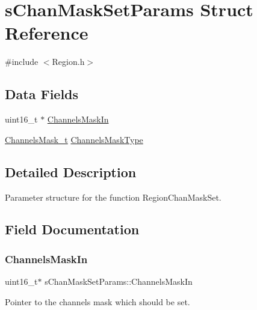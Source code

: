 \hypertarget{structsChanMaskSetParams}{}\section{s\+Chan\+Mask\+Set\+Params Struct Reference}
\label{structsChanMaskSetParams}


{\ttfamily \#include $<$Region.\+h$>$}

\subsection*{Data Fields}
\begin{DoxyCompactItemize}
\item 
uint16\+\_\+t $\ast$ \hyperlink{structsChanMaskSetParams_aac96ba5563603fe73eb614fd510cad49}{Channels\+Mask\+In}
\item 
\hyperlink{group__REGION_ga933f695eea70935418e2175940b92311}{Channels\+Mask\+\_\+t} \hyperlink{structsChanMaskSetParams_a2aeb60cf06741cba323733776ca7cebe}{Channels\+Mask\+Type}
\end{DoxyCompactItemize}


\subsection{Detailed Description}
Parameter structure for the function Region\+Chan\+Mask\+Set. 

\subsection{Field Documentation}
\mbox{\label{structsChanMaskSetParams_aac96ba5563603fe73eb614fd510cad49}} 
\subsubsection{\texorpdfstring{Channels\+Mask\+In}{ChannelsMaskIn}}
{\footnotesize\ttfamily uint16\+\_\+t$\ast$ s\+Chan\+Mask\+Set\+Params\+::\+Channels\+Mask\+In}

Pointer to the channels mask which should be set. \mbox{\label{structsChanMaskSetParams_a2aeb60cf06741cba323733776ca7cebe}} 
